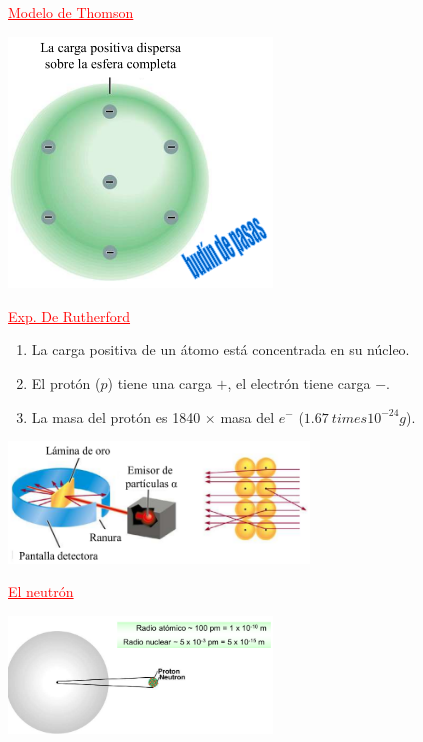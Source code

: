         \begin{center} \textcolor{red}{\underline{Modelo de Thomson}} \end{center}
            \begin{center} \includegraphics[width=7cm]{./imagenes/modeloDeThomson.png} \end{center}
        
        \begin{center} \textcolor{red}{\underline{Exp. De Rutherford}} \end{center}
            \begin{enumerate} 
                \item La carga positiva de un átomo está concentrada en su núcleo.
                \item El protón ($p$) tiene una carga $+$, el electrón tiene carga $-$.
                \item La masa del protón es 1840 $\times$ masa del $e^-$ ($1.67 \ times 10^{-24}g$).
            \end{enumerate}

            \begin{center} \includegraphics[width=8cm]{./imagenes/experimentoRutherford.png} \end{center}

        \begin{center} \textcolor{red}{\underline{El neutrón}} \end{center}
            \begin{center} \includegraphics[width=7cm] {./imagenes/neutron.png} \end{center}

